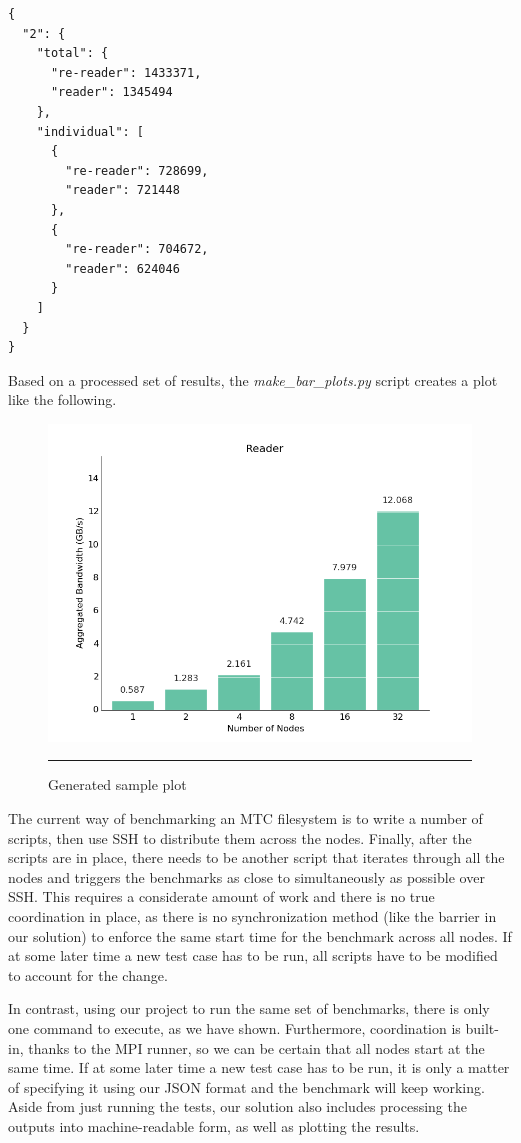 \begin{verbatim}
{
  "2": {
    "total": {
      "re-reader": 1433371, 
      "reader": 1345494
    }, 
    "individual": [
      {
        "re-reader": 728699, 
        "reader": 721448
      }, 
      {
        "re-reader": 704672, 
        "reader": 624046
      }
    ]
  }
}
\end{verbatim}

Based on a processed set of results, the \textit{make\_bar\_plots.py} script creates a plot like the following.

\begin{figure}[H]
  \centering
    \includegraphics[scale=0.5]{Figures/reader.png}
    \rule{25em}{0.5pt}
  \caption[Generated sample plot]{Generated sample plot}
  \label{fig:plot}
\end{figure}

The current way of benchmarking an MTC filesystem is to write a number of scripts, then use SSH to distribute them across the nodes. Finally, after the scripts are in place, there needs to be another
script that iterates through all the nodes and triggers the benchmarks as close to simultaneously as possible over SSH. This requires a considerate amount of work and there is no true coordination in place, as there is no synchronization method (like the barrier in our solution) to enforce the same start time for the benchmark across all nodes. If at some later time a new test case has to be run, all scripts have to be modified to account for the change.

In contrast, using our project to run the same set of benchmarks, there is only one command to execute, as we have shown. Furthermore, coordination is built-in, thanks to the MPI runner, so we can be certain that all nodes start at the same time. If at some later time a new test case has to be run, it is only a matter of specifying it using our JSON format and the benchmark will keep working. Aside from just running the tests, our solution also includes processing the outputs into machine-readable form, as well as plotting the results.
